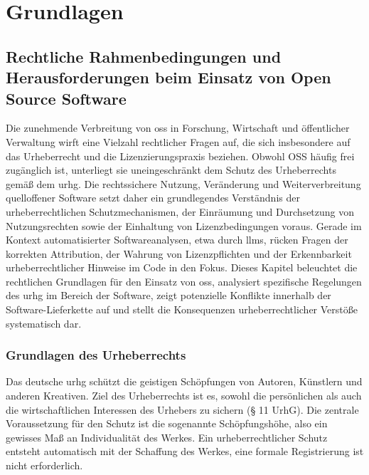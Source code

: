 \chapter{Grundlagen}\label{ch:grundlagen}


\section{Rechtliche Rahmenbedingungen und Herausforderungen beim Einsatz von Open Source Software}\label{sec:rechtliches}

Die zunehmende Verbreitung von \gls{oss} in Forschung, Wirtschaft und öffentlicher Verwaltung wirft eine Vielzahl rechtlicher Fragen auf, die sich insbesondere auf das Urheberrecht und die Lizenzierungspraxis beziehen.
Obwohl OSS häufig frei zugänglich ist, unterliegt sie uneingeschränkt dem Schutz des Urheberrechts gemäß dem \gls{urhg}.
Die rechtssichere Nutzung, Veränderung und Weiterverbreitung quelloffener Software setzt daher ein grundlegendes Verständnis der urheberrechtlichen Schutzmechanismen, der Einräumung und Durchsetzung von Nutzungsrechten sowie der Einhaltung von Lizenzbedingungen voraus.
Gerade im Kontext automatisierter Softwareanalysen, etwa durch \glspl{llm}, rücken Fragen der korrekten Attribution, der Wahrung von Lizenzpflichten und der Erkennbarkeit urheberrechtlicher Hinweise im Code in den Fokus.
Dieses Kapitel beleuchtet die rechtlichen Grundlagen für den Einsatz von \gls{oss}, analysiert spezifische Regelungen des \gls{urhg} im Bereich der Software, zeigt potenzielle Konflikte innerhalb der Software-Lieferkette auf und stellt die Konsequenzen urheberrechtlicher Verstöße systematisch dar.


\subsection{Grundlagen des Urheberrechts}

Das deutsche \acrlong{urhg} schützt die geistigen Schöpfungen von Autoren, Künstlern und anderen Kreativen.
Ziel des Urheberrechts ist es, sowohl die persönlichen als auch die wirtschaftlichen Interessen des Urhebers zu sichern (§ 11 UrhG).
Die zentrale Voraussetzung für den Schutz ist die sogenannte Schöpfungshöhe, also ein gewisses Maß an Individualität des Werkes.
Ein urheberrechtlicher Schutz entsteht automatisch mit der Schaffung des Werkes, eine formale Registrierung ist nicht erforderlich.

